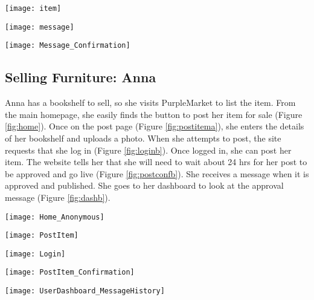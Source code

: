 \begin{center}
\label{fig:itemy}
\texttt{[image: item]}
\end{center}

\pagebreak

\begin{center}
\label{fig:msgy}
\texttt{[image: message]}
\end{center}

\begin{center}
\label{fig:msgconfy}
\texttt{[image: Message\_Confirmation]}
\end{center}

\subsection{Selling Furniture: Anna}
Anna has a bookshelf to sell, so she visits PurpleMarket to list the item.  From the main homepage, she easily finds the button to post her item for sale (Figure \ref{fig:home}).  Once on the post page (Figure \ref{fig:postitema}), she enters the details of her bookshelf and uploads a photo.  When she attempts to post, the site requests that she log in (Figure \ref{fig:loginb}).  Once logged in, she can post her item.  The website tells her that she will need to wait about 24 hrs for her post to be approved and go live (Figure \ref{fig:postconfb}).  She receives a message when it is approved and published.  She goes to her dashboard to look at the approval message (Figure \ref{fig:dashb}).

\vspace{5mm}
\begin{center}
\label{fig:home}
\texttt{[image: Home\_Anonymous]}
\end{center}

\pagebreak

\begin{center}
\label{fig:postitema}
\texttt{[image: PostItem]}
\end{center}

\begin{center}
\label{fig:loginb}
\texttt{[image: Login]}
\end{center}

\pagebreak

\begin{center}
\label{fig:postconfb}
\texttt{[image: PostItem\_Confirmation]}
\end{center}

\begin{center}
\label{fig:dashb}
\texttt{[image: UserDashboard\_MessageHistory]}
\end{center}

